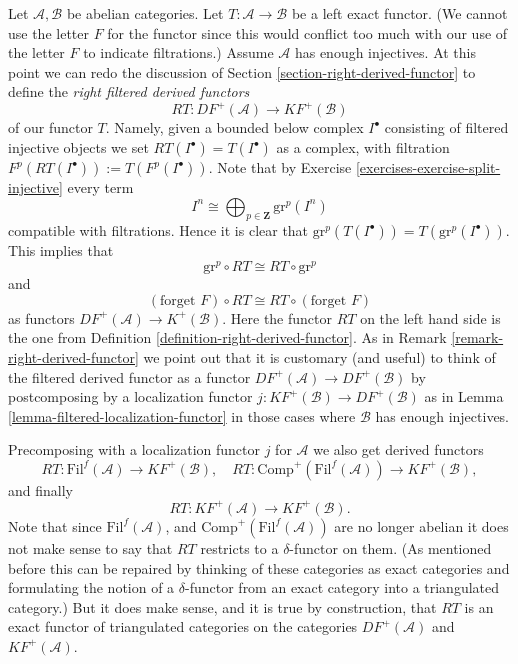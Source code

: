 \noindent
Let $\mathcal{A}, \mathcal{B}$ be abelian categories.
Let $T : \mathcal{A} \to \mathcal{B}$ be a left exact functor.
(We cannot use the letter $F$ for the functor since this would
conflict too much with our use of the letter $F$ to indicate
filtrations.)
Assume $\mathcal{A}$ has enough injectives.
At this point we can redo the discussion of 
Section \ref{section-right-derived-functor} to define the
{\it right filtered derived functors}
\begin{equation}
\label{equation-filtered-derived-functor}
RT : DF^{+}(\mathcal{A}) \longrightarrow KF^{+}(\mathcal{B})
\end{equation}
of our functor $T$. Namely, given a bounded below complex $I^\bullet$
consisting of filtered injective objects we set
$RT(I^\bullet) = T(I^\bullet)$ as a complex, with filtration
$F^p(RT(I^\bullet)) := T(F^p(I^\bullet))$. Note that by
Exercise \ref{exercises-exercise-split-injective} every term
\begin{equation}
\label{equation-decompose}
I^n \cong \bigoplus\nolimits_{p \in \mathbf{Z}} \text{gr}^p(I^n)
\end{equation}
compatible with filtrations. Hence it is clear that
$\text{gr}^p(T(I^\bullet)) = T(\text{gr}^p(I^\bullet))$.
This implies that
\begin{equation}
\label{equation-commute-gr}
\text{gr}^p \circ RT \cong RT \circ \text{gr}^p
\end{equation}
and
\begin{equation}
\label{equation-commute-forget}
(\text{forget }F) \circ RT \cong RT \circ (\text{forget }F)
\end{equation}
as functors $DF^{+}(\mathcal{A}) \to K^{+}(\mathcal{B})$.
Here the functor $RT$ on the left hand side is the one from
Definition \ref{definition-right-derived-functor}.
As in Remark \ref{remark-right-derived-functor} we point out that it
is customary (and useful) to think of the filtered derived functor
as a functor $DF^{+}(\mathcal{A}) \to DF^{+}(\mathcal{B})$
by postcomposing by a localization functor
$j : KF^{+}(\mathcal{B}) \to DF^{+}(\mathcal{B})$ as in
Lemma \ref{lemma-filtered-localization-functor}
in those cases where $\mathcal{B}$ has enough injectives.

\medskip\noindent
Precomposing with a localization functor $j$ for $\mathcal{A}$
we also get derived functors
$$
RT : \text{Fil}^f(\mathcal{A}) \to KF^{+}(\mathcal{B}),
\quad
RT : \text{Comp}^{+}(\text{Fil}^f(\mathcal{A})) \to KF^{+}(\mathcal{B}),
$$
and finally
$$
RT : KF^{+}(\mathcal{A}) \to KF^{+}(\mathcal{B}).
$$
Note that since $\text{Fil}^f(\mathcal{A})$, and
$\text{Comp}^{+}(\text{Fil}^f(\mathcal{A}))$ are no longer
abelian it does not make sense to say that $RT$ restricts to
a $\delta$-functor on them. (As mentioned before this can be
repaired by thinking of these categories as exact categories and
formulating the notion of a $\delta$-functor from an exact category
into a triangulated category.)
But it does make sense, and it is true
by construction, that $RT$ is an exact functor of triangulated
categories on the categories $DF^{+}(\mathcal{A})$ and
$KF^{+}(\mathcal{A})$.

